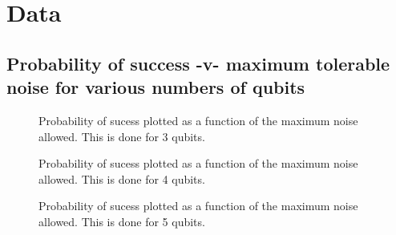 \chapter{Data}
\label{chap:data}
%

\newlength{\dataheight}
\setlength{\dataheight}{4in}
\newlength{\datawidth}
\setlength{\datawidth}{4.5in}

\section{Probability of success -v- maximum tolerable noise for various
numbers of qubits}

\pagebreak


%
\begin{figure}[h]
\begin{center}
\end{center}
\caption{Probability of sucess plotted as a function of the maximum noise allowed.
This is done for 3 qubits.}
\end{figure}

\pagebreak

\begin{figure}[h]
\begin{center}
\end{center}
\caption{Probability of sucess plotted as a function of the maximum noise allowed.
This is done for 4 qubits.}
\end{figure}

\pagebreak

\begin{figure}[h]
\begin{center}
\end{center}
\caption{Probability of sucess plotted as a function of the maximum noise allowed.
This is done for 5 qubits.}
\end{figure}

